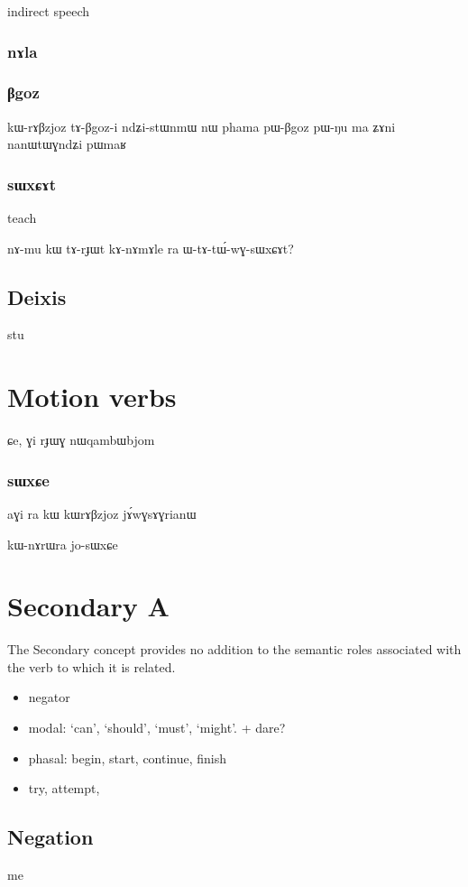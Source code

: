 \documentclass[oldfontcommands,oneside,a4paper,11pt]{article}
\begin{document}
  indirect speech
 \subsubsection{nɤla}
 
\subsubsection{βgoz}
kɯ-rɤβzjoz tɤ-βgoz-i
 ndʑi-stɯnmɯ nɯ phama pɯ-βgoz pɯ-ŋu ma ʑɤni nanɯtɯɣndʑi pɯmaʁ
 
\subsubsection{sɯxɕɤt} 
teach

 nɤ-mu kɯ tɤ-rɟɯt kɤ-nɤmɤle ra   ɯ-tɤ-tɯ́-wɣ-sɯxɕɤt?
\subsection{Deixis}
 stu
 
 \section{Motion verbs}
 
 \citealt{jacques13harmonization}
 ɕe, ɣi rɟɯɣ nɯqambɯbjom
 \subsubsection{sɯxɕe}
 aɣi ra kɯ kɯrɤβzjoz jɤ́wɣsɤɣrianɯ
 
 
 kɯ-nɤrɯra jo-sɯxɕe
 \section{Secondary A} 
  The Secondary concept provides no addition to the semantic roles associated with the verb to which it is related.
   \begin{itemize}
\item negator
\item modal: ‘can’, ‘should’, ‘must’, ‘might’. + dare?
\item phasal: begin, start, continue, finish
\item try, attempt,  
\end{itemize}

  \subsection{Negation}
  me
  
\end{document}
